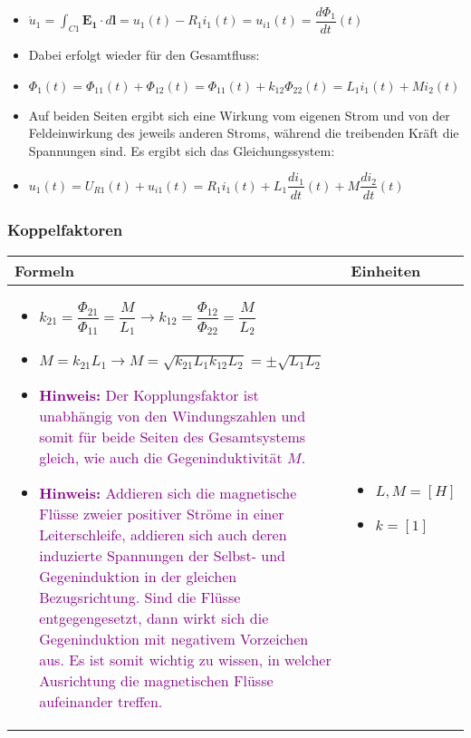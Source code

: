 \begin{itemize}
\item[] $\mathring{u}_1=\displaystyle\int_{C1}\mathbf{E_1}\cdot d\mathbf{l} =u_1(t)-R_1i_1(t)=u_{i1}(t)=\dfrac{d\Phi_1}{dt}(t)$
\item Dabei erfolgt wieder für den Gesamtfluss:
\item[] $\Phi_1(t) = \Phi_{11}(t) +\Phi_{12}(t)=\Phi_{11}(t)+k_{12}\Phi_{22}
(t)=L_1i_1(t)+Mi_2(t)$
\item Auf beiden Seiten ergibt sich eine Wirkung vom eigenen Strom und von der Feldeinwirkung des jeweils anderen Stroms, während die treibenden Kräft die Spannungen sind. Es ergibt sich das Gleichungssystem:
\item[] $u_1(t)=U_{R1}(t)+u_{i1}(t)=R_1i_1(t)+L_1\dfrac{di_1}{dt}(t)+M\dfrac{di_2}{dt}(t)$	
\end{itemize}

   	\subsubsection{Koppelfaktoren}										
\begin{tabular}{ | m{15cm} | m{3cm}  | }
	\hline
	Formeln & Einheiten \\ \hline
	\hline
	\begin{itemize}
		\item[] $k_{21}=\dfrac{\Phi_{21}}{\Phi_{11}}=\dfrac{M}{L_1} \rightarrow k_{12}=\dfrac{\Phi_{12}}{\Phi_{22}}=\dfrac{M}{L_2} $
		\item[] $M=k_{21}L_1 \rightarrow M=\sqrt{k_{21}L_1k_{12}L_2}=\pm\sqrt{L_1L_2}$
		\item[] \textcolor{purple}{\textbf{Hinweis:} Der Kopplungsfaktor ist unabhängig von den Windungszahlen und somit für beide Seiten des Gesamtsystems gleich, wie auch die Gegeninduktivität $M$.}
		\item[] \textcolor{purple}{\textbf{Hinweis:} Addieren sich die magnetische Flüsse zweier positiver Ströme in einer Leiterschleife, addieren sich auch deren induzierte Spannungen der Selbst- und Gegeninduktion in der gleichen Bezugsrichtung. Sind die Flüsse entgegengesetzt, dann wirkt sich die Gegeninduktion mit negativem Vorzeichen aus. Es ist somit wichtig zu wissen, in welcher Ausrichtung die magnetischen Flüsse aufeinander treffen.}
	\end{itemize} 
	&   	
	\begin{itemize}
		\item[] $L,M = [H]$
		\item[] $k= [1]$
	\end{itemize} 
	\\ \hline
\end{tabular}

